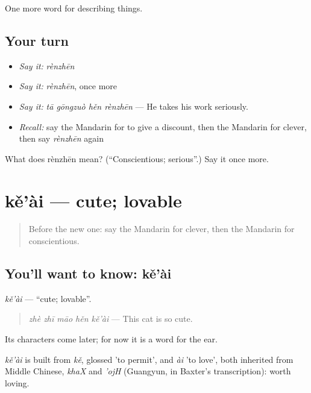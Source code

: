 \begin{grammarlens}[title={What you've built}]
One more word for describing things.
\end{grammarlens}

\subsection*{Your turn}
\begin{itemize}
\raggedright
  \item \emph{Say it:} \emph{rènzhēn}
  \item \emph{Say it:} \emph{rènzhēn}, once more
  \item \emph{Say it:} \emph{tā gōngzuò hěn rènzhēn} — He takes his work seriously.
  \item \emph{Recall:} say the Mandarin for to give a discount, then the Mandarin for clever, then say \emph{rènzhēn} again
\end{itemize}

\begin{tcolorbox}[breakable,colback=teal!4,colframe=teal!35!black,title={Before you move on}]
What does rènzhēn mean? (\textquotedblleft{}Conscientious; serious\textquotedblright{}.) Say it once more.
\end{tcolorbox}
\section[kě'ài]{kě'ài — cute; lovable}

\label{lesson:ZH-C123-keai}



\begin{quote}
Before the new one: say the Mandarin for clever, then the Mandarin for conscientious.
\end{quote}

\subsection*{You'll want to know: kě'ài}
\emph{kě'ài} — \textquotedblleft{}cute; lovable\textquotedblright{}.

\begin{quote}
\emph{zhè zhī māo hěn kě'ài} — This cat is so cute.
\end{quote}

Its characters come later; for now it is a word for the ear.

\begin{cousinweb}
\emph{kě'ài} is built from \emph{kě}, glossed 'to permit', and \emph{ài} 'to love', both inherited from Middle Chinese, \emph{khaX} and \emph{'ojH} (Guangyun, in Baxter's transcription): worth loving.
\end{cousinweb}

